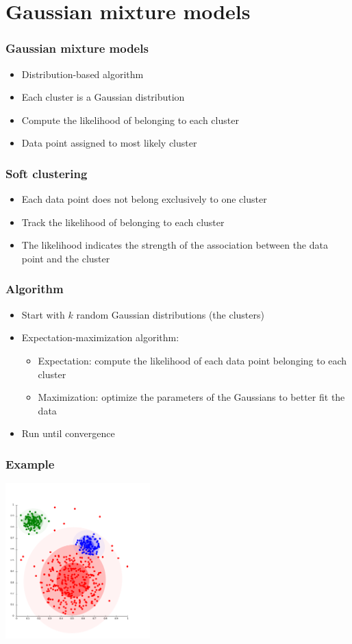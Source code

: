 \documentclass[10pt]{beamer}
\begin{document}
\section{Gaussian mixture models}

\begin{frame}
  \frametitle{Gaussian mixture models}
  \begin{itemize}
    \item Distribution-based algorithm
	\item Each cluster is a Gaussian distribution
	\item Compute the {\color{red} likelihood} of belonging to each cluster
	\item Data point assigned to most likely cluster
  \end{itemize}
\end{frame}

\begin{frame}
  \frametitle{Soft clustering}
  \begin{itemize}
    \item Each data point does not belong exclusively to one cluster
	\item Track the {\color{blue} likelihood} of belonging to each cluster
	\item The likelihood indicates the strength of the association between the data point and the cluster
  \end{itemize}
\end{frame}

\begin{frame}
  \frametitle{Algorithm}
  \begin{itemize}
    \item Start with $k$ random Gaussian distributions (the clusters)
	\item Expectation-maximization algorithm:
  \begin{itemize}
    \item Expectation: compute the likelihood of each data point belonging to each cluster
	\item Maximization: optimize the parameters of the Gaussians to better fit the data
  \end{itemize}
	\item Run until convergence
  \end{itemize}
\end{frame}

\begin{frame}
  \frametitle{Example}
  \centerline{\includegraphics[height=6cm]{images/clustery.png}}
\end{frame}
\end{document}
